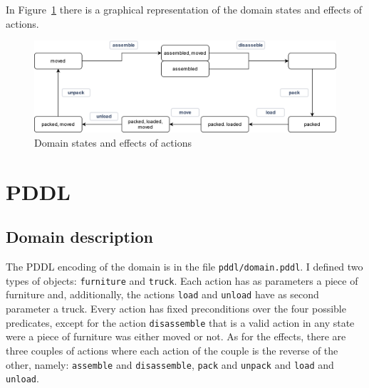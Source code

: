 \documentclass[12pt]{article}
\begin{document}
    In Figure~\ref{fig:domain} there is a graphical representation of the domain states and effects of actions.
    \begin{figure}[ht]
        \centering
        \includegraphics[width=\textwidth]{../img/diagram}
        \caption{Domain states and effects of actions}
        \label{fig:domain}
    \end{figure}

    \section{PDDL}\label{sec:pddl}

    \subsection{Domain description}\label{subsec:pddl-domain}
    The PDDL encoding of the domain is in the file \texttt{pddl/domain.pddl}.
    I defined two types of objects: \texttt{furniture} and \texttt{truck}.
    Each action has as parameters a piece of furniture and, additionally, the actions \texttt{load} and \texttt{unload} have as second parameter a truck.
    Every action has fixed preconditions over the four possible predicates, except for the action \texttt{disassemble} that is a valid action in any state were a piece of furniture was either moved or not.
    As for the effects, there are three couples of actions where each action of the couple is the reverse of the other, namely: \texttt{assemble} and \texttt{disassemble}, \texttt{pack} and \texttt{unpack} and \texttt{load} and \texttt{unload}.
\end{document}
